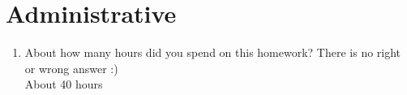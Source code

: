 \documentclass{article}
\begin{document}
\begin{sloppypar}

\section*{Administrative}
\begin{aprob}
\begin{enumerate}
    \item {} About how many hours did you spend on this homework? There is no right or wrong answer :) \\
    About 40 hours
\end{enumerate}
\end{aprob}
\end{sloppypar}
\end{document}
